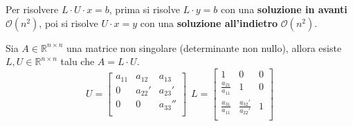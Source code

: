 Per risolvere $L\cdot U \cdot x =b$, prima si risolve $L\cdot y =b$ con una \textbf{
    soluzione in avanti} $\mathcal{O}(n^2)$, poi si risolve $U\cdot x =y$ con una \textbf{
        soluzione all'indietro} $\mathcal{O}(n^2)$.

\begin{teorema}
    Sia $A\in \mathbb{R}^{n\times n}$ una matrice non singolare (determinante 
    non nullo), allora esiste $L,U \in \mathbb{R}^{n\times n}$ talu che $A=L\cdot U$.
    \begin{equation*}
        U=\left[\begin{array}{ccc}
            a_{11} & a_{12} & a_{13}\\
            0 & a_{22}' & a_{23}'\\
            0 & 0 & a_{33}''\\
        \end{array}\right] \ \ L=\left[\begin{array}{ccc}
            1 & 0 & 0\\
            \frac{a_{ 21}}{a_{11}} & 1 & 0\\
            \frac{a_{31}}{a_{11}} & \frac{a_{32}'}{a_{22}'} & 1\\
        \end{array}\right]
    \end{equation*}

\end{teorema}